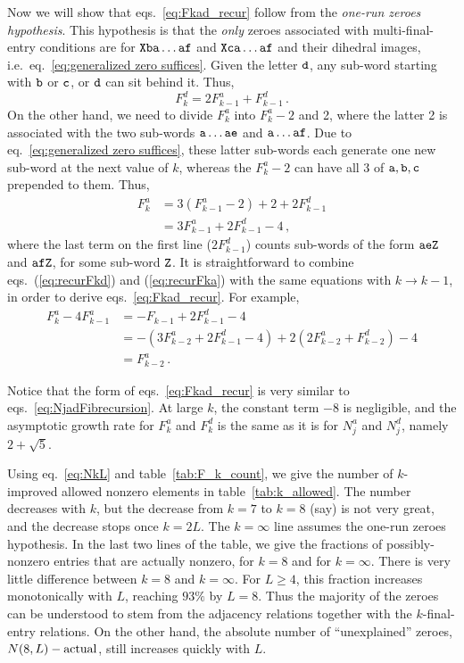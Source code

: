 \documentclass[12pt]{article}
\def\eqn#1{eq.~\eqref{#1}}
\begin{document}
Now we will show that eqs.~\eqref{eq:Fkad_recur} follow from the {\it one-run zeroes hypothesis}.
This hypothesis is that the \emph{only} zeroes associated with multi-final-entry conditions are for ${\tt X ba\ldots af}$ and ${\tt Xca\ldots af}$ and their dihedral images, i.e.~eq.~\eqref{eq:generalized zero suffices}. Given the letter ${\tt d}$, any sub-word starting with ${\tt b}$ or ${\tt c}$, or ${\tt d}$ can sit behind it.  Thus,
%
\begin{equation}
F_k^d = 2 F_{k-1}^a + F_{k-1}^d \,.
\label{eq:recurFkd}
\end{equation}
%
On the other hand, we need to divide $F_k^a$ into $F_k^a-2$ and 2, where the latter 2 is associated with the two sub-words ${\tt a\ldots ae}$ and ${\tt a\ldots af}$.  Due to eq.~\eqref{eq:generalized zero suffices}, these latter sub-words each generate one new sub-word at the next value of $k$, whereas the $F_k^a-2$ can have all 3 of ${\tt a,b,c}$ prepended to them.  Thus,
%
\begin{align}
F_k^a &= 3 (F_{k-1}^a - 2) + 2 + 2 F_{k-1}^d 
\label{eq:recurFka}\\
  &= 3 F_{k-1}^a + 2 F_{k-1}^d - 4 \,, \nonumber
\end{align}
%
where the last term on the first line ($2 F_{k-1}^d$) counts sub-words of the form ${\tt aeZ}$ and ${\tt afZ}$, for some sub-word ${\tt Z}$.
It is straightforward to combine eqs.~(\ref{eq:recurFkd}) and (\ref{eq:recurFka}) with the same equations with $k \to k-1$, in order to derive eqs.~\eqref{eq:Fkad_recur}.
For example, 
%
\begin{align}
F_k^a - 4 F_{k-1}^a &= - F_{k-1} + 2 F_{k-1}^d - 4 \nonumber\\
  &= - ( 3 F_{k-2}^a + 2 F_{k-1}^d - 4 ) + 2 (2 F_{k-2}^a + F_{k-2}^d ) - 4\nonumber\\
  &= F_{k-2}^a \,.
  \label{eq:deriveFka}
\end{align}
%

Notice that the form of eqs.~\eqref{eq:Fkad_recur} is very similar to eqs.~\eqref{eq:NjadFibrecursion}.  At large $k$, the constant term $-8$ is negligible, and the asymptotic growth rate for $F_k^a$ and $F_k^d$ is the same as it is for $N_j^a$ and $N_j^d$, namely $2+\sqrt{5}$.

Using \eqn{eq:NkL} and table~\ref{tab:F_k_count}, we give the number of $k$-improved allowed nonzero elements in table~\ref{tab:k_allowed}.  The number decreases with $k$, but the decrease from $k=7$ to $k=8$ (say) is not very great, and the decrease stops once $k=2L$. The $k=\infty$ line assumes the one-run zeroes hypothesis. In the last two lines of the table, we give the fractions of possibly-nonzero entries that are actually nonzero, for $k=8$ and for $k=\infty$. There is very little difference between $k=8$ and $k=\infty$. For $L\geq4$, this fraction increases monotonically with $L$, reaching $93\%$ by $L=8$.  Thus the majority of the zeroes can be understood to stem from the adjacency relations together with the $k$-final-entry relations.  On the other hand, the absolute number of ``unexplained'' zeroes, $N(8,L)-{\rm actual}$, still increases quickly with $L$.
\end{document}
